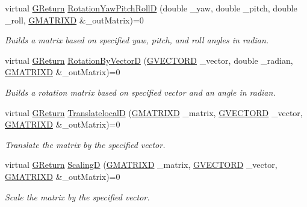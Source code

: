 \begin{DoxyCompactItemize}
virtual \hyperlink{namespaceGW_a67a839e3df7ea8a5c5686613a7a3de21}{G\+Return} \hyperlink{classGW_1_1MATH_1_1GMatrix_ae63a0eacd6030eeed28dec461986e322}{Rotation\+Yaw\+Pitch\+RollD} (double \+\_\+yaw, double \+\_\+pitch, double \+\_\+roll, \hyperlink{structGW_1_1MATH_1_1GMATRIXD}{G\+M\+A\+T\+R\+I\+XD} \&\+\_\+out\+Matrix)=0
\begin{DoxyCompactList}\small\item\em Builds a matrix based on specified yaw, pitch, and roll angles in radian. \end{DoxyCompactList}\item 
virtual \hyperlink{namespaceGW_a67a839e3df7ea8a5c5686613a7a3de21}{G\+Return} \hyperlink{classGW_1_1MATH_1_1GMatrix_a7262ab71d767293693314c60076652fe}{Rotation\+By\+VectorD} (\hyperlink{structGW_1_1MATH_1_1GVECTORD}{G\+V\+E\+C\+T\+O\+RD} \+\_\+vector, double \+\_\+radian, \hyperlink{structGW_1_1MATH_1_1GMATRIXD}{G\+M\+A\+T\+R\+I\+XD} \&\+\_\+out\+Matrix)=0
\begin{DoxyCompactList}\small\item\em Builds a rotation matrix based on specified vector and an angle in radian. \end{DoxyCompactList}\item 
virtual \hyperlink{namespaceGW_a67a839e3df7ea8a5c5686613a7a3de21}{G\+Return} \hyperlink{classGW_1_1MATH_1_1GMatrix_a03adfd30119a70006679ee98a320591a}{TranslatelocalD} (\hyperlink{structGW_1_1MATH_1_1GMATRIXD}{G\+M\+A\+T\+R\+I\+XD} \+\_\+matrix, \hyperlink{structGW_1_1MATH_1_1GVECTORD}{G\+V\+E\+C\+T\+O\+RD} \+\_\+vector, \hyperlink{structGW_1_1MATH_1_1GMATRIXD}{G\+M\+A\+T\+R\+I\+XD} \&\+\_\+out\+Matrix)=0
\begin{DoxyCompactList}\small\item\em Translate the matrix by the specified vector. \end{DoxyCompactList}\item 
virtual \hyperlink{namespaceGW_a67a839e3df7ea8a5c5686613a7a3de21}{G\+Return} \hyperlink{classGW_1_1MATH_1_1GMatrix_adcfdcd010361f3de14661e7d8a54a1dc}{ScalingD} (\hyperlink{structGW_1_1MATH_1_1GMATRIXD}{G\+M\+A\+T\+R\+I\+XD} \+\_\+matrix, \hyperlink{structGW_1_1MATH_1_1GVECTORD}{G\+V\+E\+C\+T\+O\+RD} \+\_\+vector, \hyperlink{structGW_1_1MATH_1_1GMATRIXD}{G\+M\+A\+T\+R\+I\+XD} \&\+\_\+out\+Matrix)=0
\begin{DoxyCompactList}\small\item\em Scale the matrix by the specified vector. \end{DoxyCompactList}\item 

\end{DoxyCompactItemize}
